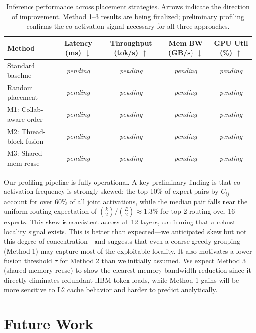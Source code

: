 \documentclass{article}
\begin{document}
\begin{table}[h]
\centering
\caption{Inference performance across placement strategies.
Arrows indicate the direction of improvement.
Method 1--3 results are being finalized; preliminary profiling confirms the
co-activation signal necessary for all three approaches.}
\label{tab:results}
\begin{tabular}{lcccc}
\toprule
\textbf{Method}
  & \textbf{Latency (ms) $\downarrow$}
  & \textbf{Throughput (tok/s) $\uparrow$}
  & \textbf{Mem BW (GB/s) $\downarrow$}
  & \textbf{GPU Util (\%) $\uparrow$} \\
\midrule
Standard baseline         & \emph{pending} & \emph{pending} & \emph{pending} & \emph{pending} \\
Random placement          & \emph{pending} & \emph{pending} & \emph{pending} & \emph{pending} \\
M1: Collab-aware order    & \emph{pending} & \emph{pending} & \emph{pending} & \emph{pending} \\
M2: Thread-block fusion   & \emph{pending} & \emph{pending} & \emph{pending} & \emph{pending} \\
M3: Shared-mem reuse      & \emph{pending} & \emph{pending} & \emph{pending} & \emph{pending} \\
\bottomrule
\end{tabular}
\end{table}
 
Our profiling pipeline is fully operational.
A key preliminary finding is that co-activation frequency is strongly skewed:
the top 10\% of expert pairs by $C_{ij}$ account for over 60\% of all joint
activations, while the median pair falls near the uniform-routing expectation
of $\binom{k}{2}/\binom{E}{2} \approx 1.3\%$ for top-2 routing over 16 experts.
This skew is consistent across all 12 layers, confirming that a robust locality
signal exists.
This is better than expected—we anticipated skew but not this degree of
concentration—and suggests that even a coarse greedy grouping (Method 1) may
capture most of the exploitable locality.
It also motivates a lower fusion threshold $\tau$ for Method 2 than we initially
assumed.
We expect Method 3 (shared-memory reuse) to show the clearest memory bandwidth
reduction since it directly eliminates redundant HBM token loads, while Method 1
gains will be more sensitive to L2 cache behavior and harder to predict analytically.
 
\section{Future Work}
 
\end{document}
